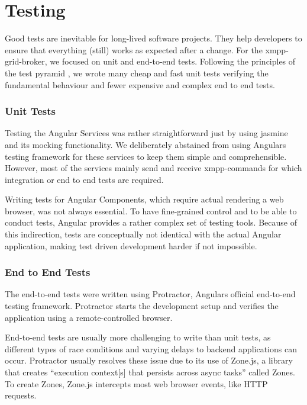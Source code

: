 \section{Testing}\label{sec:testing}

Good tests are inevitable for long-lived software projects.
They help developers to ensure that everything (still) works as expected after a change.
For the \gls{xmpp-grid-broker}, we focused on unit and end-to-end tests.
Following the principles of the test pyramid \cite{Cohn:2009:SAS:1667109}, we wrote many cheap and fast unit tests verifying the fundamental behaviour and fewer expensive and complex end to end tests.

\subsubsection{Unit Tests}

Testing the Angular Services was rather straightforward just by using jasmine and its mocking functionality.
We deliberately abstained from using Angulars testing framework for these services to keep them simple and comprehensible.
However, most of the services mainly send and receive \gls{xmpp}-commands for which integration or end to end tests are required.

Writing tests for Angular Components, which require actual rendering a web browser, was not always essential.
To have fine-grained control and to be able to conduct tests, Angular provides a rather complex set of testing tools.
Because of this indirection, tests are conceptually not identical with the actual Angular application, making test driven development harder if not impossible.

\subsubsection{End to End Tests}

The end-to-end tests were written using Protractor, Angulars official end-to-end testing framework.
Protractor starts the development setup and verifies the application using a remote-controlled browser.

End-to-end tests are usually more challenging to write than unit tests, as different types of race conditions and varying delays to backend applications can occur.
Protractor usually resolves these issue due to its use of Zone.js, a library that creates ``execution context[s] that persists across async tasks'' called Zones.
To create Zones, Zone.js intercepts most web browser events, like HTTP requests.~\cite{zone-js-readme}

